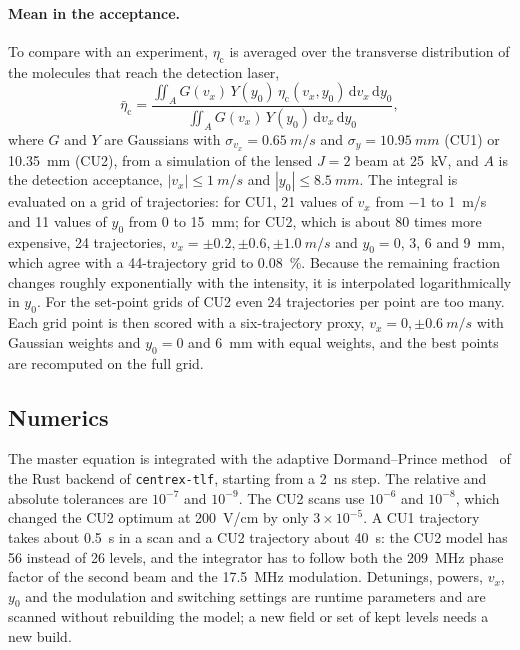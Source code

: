 \documentclass[11pt,a4paper,oneside]{report}
\newcommand{\code}[1]{\texttt{#1}}
\newcommand{\etac}{\eta_{\mathrm{c}}}
\newcommand{\sigy}{\sigma_{y}}
\begin{document}
\paragraph{Mean in the acceptance.} To compare with an experiment, $\etac$ is averaged over the
transverse distribution of the molecules that reach the detection laser,
\begin{equation}
  \bar\eta_{\mathrm c}=\frac{\iint_A G(v_x)\,Y(y_0)\,\etac(v_x,y_0)\,\mathrm dv_x\,\mathrm dy_0}
  {\iint_A G(v_x)\,Y(y_0)\,\mathrm dv_x\,\mathrm dy_0},
  \label{eq:accmean}
\end{equation}
where $G$ and $Y$ are Gaussians with $\sigma_{v_x}=\SI{0.65}{m/s}$ and $\sigy=\SI{10.95}{mm}$ (CU1) or
\SI{10.35}{mm} (CU2), from a simulation of the lensed $J=2$ beam at \SI{25}{kV}, and $A$ is the
detection acceptance, $|v_x|\leq\SI{1}{m/s}$ and $|y_0|\leq\SI{8.5}{mm}$. The integral is evaluated on
a grid of trajectories: for CU1, 21 values of $v_x$ from $-1$ to \SI{1}{m/s} and 11 values of $y_0$ from
0 to \SI{15}{mm}; for CU2, which is about 80 times more expensive, 24 trajectories,
$v_x=\pm0.2,\pm0.6,\pm\SI{1.0}{m/s}$ and $y_0=0$, 3, 6 and \SI{9}{mm}, which agree with a
44-trajectory grid to \SI{0.08}{\percent}. Because the remaining fraction changes roughly
exponentially with the intensity, it is interpolated logarithmically in $y_0$. For the set-point grids
of CU2 even 24 trajectories per point are too many. Each grid point is then scored with a
six-trajectory proxy, $v_x=0,\pm\SI{0.6}{m/s}$ with Gaussian weights and $y_0=0$ and \SI{6}{mm} with
equal weights, and the best points are recomputed on the full grid.

\subsection{Numerics}
\label{sec:model_num}

The master equation is integrated with the adaptive Dormand--Prince method~\cite{Dormand1980} of the
Rust backend of \code{centrex-tlf}, starting from a \SI{2}{ns} step. The relative and absolute
tolerances are $10^{-7}$ and $10^{-9}$. The CU2 scans use $10^{-6}$ and $10^{-8}$, which changed the
CU2 optimum at \SI{200}{V/cm} by only $3\times10^{-5}$. A CU1 trajectory takes about \SI{0.5}{s} in a
scan and a CU2 trajectory about \SI{40}{s}: the CU2 model has 56 instead of 26 levels, and the
integrator has to follow both the \SI{209}{MHz} phase factor of the second beam and the
\SI{17.5}{MHz} modulation. Detunings, powers, $v_x$, $y_0$ and the modulation and switching settings
are runtime parameters and are scanned without rebuilding the model; a new field or set of kept
levels needs a new build.
\end{document}

